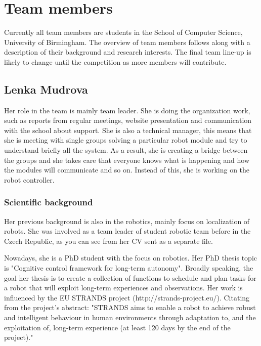\documentclass[conference]{IEEEtran}
\begin{document}
\section{Team members}

Currently all team members are students in the School of Computer Science, University of Birmingham. The overview of team members follows along with a description of their background and research interests. The final team line-up is likely to change until the competition as more members will contribute.

\subsection{Lenka Mudrova}

Her role in the team is mainly team leader. She is doing the organization work, such as reports from regular meetings, website presentation and communication with the school about support. She is also a technical manager, this means that she is meeting with single groups solving a particular robot module and try to understand briefly all the system. As a result, she is creating a bridge between the groups and she takes care that everyone knows what is happening and how the modules will communicate and so on. Instead of this, she is working on the robot controller.

\subsubsection*{Scientific background}
Her previous background is also in the robotics, mainly focus on localization of robots. She was involved as a team leader of student robotic team before in the Czech Republic, as you can see from her CV sent as a separate file.

Nowadays, she is a PhD student with the focus on robotics. Her PhD thesis topic is "Cognitive control framework for long-term autonomy". Broadly speaking, the goal her thesis is to create a collection of functions to schedule and plan tasks for a robot that will exploit long-term experiences and observations. Her work is influenced by the EU STRANDS project (http://strands-project.eu/). Citating from the project’s abstract: "STRANDS aims to enable a robot to achieve robust and intelligent behaviour in human environments through adaptation to, and the exploitation of, long-term experience (at least 120 days by the end of the project)."
\end{document}
